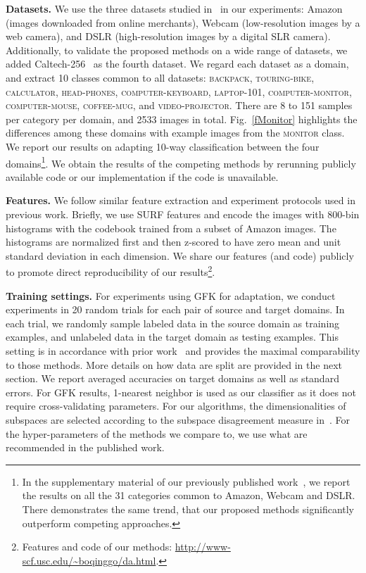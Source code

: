 {\bf Datasets.} We use the three datasets studied in~\cite{saenko2010adapting} in our experiments: Amazon (images downloaded from online merchants), Webcam (low-resolution images by a web camera), and DSLR (high-resolution images by a digital SLR camera).  Additionally, to validate the proposed methods on a wide range of datasets, we added Caltech-256~\cite{Caltech256} as the fourth dataset. We regard each dataset as a domain, and extract 10 classes common to all datasets: \textsc{backpack, touring-bike, calculator, head-phones, computer-keyboard, laptop-101, computer-monitor, computer-mouse, coffee-mug,} and \textsc{video-projector}.  There are 8 to 151 samples per category per domain, and 2533 images in total. Fig.~\ref{fMonitor} highlights the differences among these domains  with example images from the \textsc{monitor} class. We report our results on adapting 10-way classification between the four domains\footnote{In the supplementary material of our previously published work~\cite{gong12gfk}, we report the results on  all the 31 categories common to Amazon, Webcam and DSLR. There demonstrates the same trend, that our proposed methods significantly outperform competing approaches.}. We obtain the results of the competing methods by rerunning publicly available code or our implementation if the code is unavailable.

{\bf Features.} We follow similar feature extraction and experiment protocols used in previous work. Briefly, we use SURF features \cite{bay2006surf} and encode the images with 800-bin histograms with the codebook trained from a subset of Amazon images. The histograms are normalized first and then z-scored to  have zero mean and unit standard deviation in each dimension. We share our features (and code) publicly to promote direct reproducibility of our results\footnote{Features and code of our methods: \url{http://www-scf.usc.edu/~boqinggo/da.html}.}.

{\bf Training settings.} For experiments using GFK for adaptation, we conduct experiments in 20 random trials for each pair of source and target domains.  In each trial, we randomly sample labeled data in the source domain as training examples, and unlabeled data in the target domain as testing examples. This setting is in accordance with prior work~\cite{saenko2010adapting,kulisyou,gopalan2011domain} and provides the maximal comparability to those methods. More details on how data are split are provided in the next section. We report averaged accuracies on target domains as well as standard errors.  For GFK results, 1-nearest neighbor is used as our classifier as it does not require cross-validating parameters.  For our algorithms,  the dimensionalities of subspaces are selected according to the subspace disagreement measure in~\cite{GongCVPR12Geodesic}.  For the hyper-parameters of the methods we compare to, we use what are recommended in the published work.

